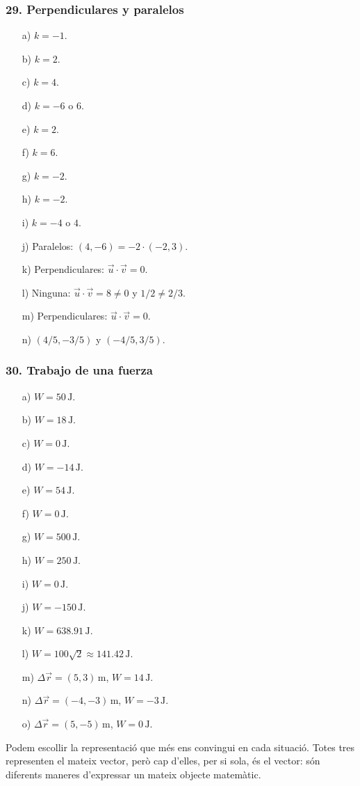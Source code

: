 \subsubsection*{29. Perpendiculares y paralelos}
\begin{enumerate}
    \item[a)] $k=-1$.
    \item[b)] $k=2$.
    \item[c)] $k=4$.
    \item[d)] $k=-6$ o $6$.
    \item[e)] $k=2$.
    \item[f)] $k=6$.
    \item[g)] $k=-2$.
    \item[h)] $k=-2$.
    \item[i)] $k=-4$ o $4$.
    \item[j)] Paralelos: $(4,-6)=-2\cdot(-2,3)$.
    \item[k)] Perpendiculares: $\vec{u}\cdot\vec{v}=0$.
    \item[l)] Ninguna:
    $\vec{u}\cdot\vec{v}=8\neq0$ y $1/2\neq2/3$.
    \item[m)] Perpendiculares: $\vec{u}\cdot\vec{v}=0$.
    \item[n)] $(4/5,-3/5)$ y $(-4/5,3/5)$.
\end{enumerate}

\subsubsection*{30. Trabajo de una fuerza}
\begin{enumerate}
    \item[a)] $W=50\,\mathrm{J}$.
    \item[b)] $W=18\,\mathrm{J}$.
    \item[c)] $W=0\,\mathrm{J}$.
    \item[d)] $W=-14\,\mathrm{J}$.
    \item[e)] $W=54\,\mathrm{J}$.
    \item[f)] $W=0\,\mathrm{J}$.
    \item[g)] $W=500\,\mathrm{J}$.
    \item[h)] $W=250\,\mathrm{J}$.
    \item[i)] $W=0\,\mathrm{J}$.
    \item[j)] $W=-150\,\mathrm{J}$.
    \item[k)] $W=638.91\,\mathrm{J}$.
    \item[l)] $W=100\sqrt{2}\approx141.42\,\mathrm{J}$.
    \item[m)] $\Delta\vec{r}=(5,3)\,\mathrm{m}$,
    $W=14\,\mathrm{J}$.
    \item[n)] $\Delta\vec{r}=(-4,-3)\,\mathrm{m}$,
    $W=-3\,\mathrm{J}$.
    \item[o)] $\Delta\vec{r}=(5,-5)\,\mathrm{m}$,
    $W=0\,\mathrm{J}$.
\end{enumerate}Podem escollir la representació que més ens convingui en cada situació. Totes tres representen el mateix vector, però cap d’elles, per si sola, és el vector: són diferents maneres d’expressar un mateix objecte matemàtic.

